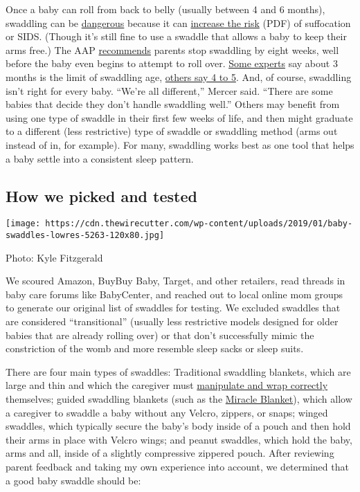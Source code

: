 Once a baby can roll from back to belly (usually between 4 and 6
months), swaddling can be
\href{http://pediatrics.aappublications.org/content/138/5/e20162938}{dangerous}
because it can
\href{http://pediatrics.aappublications.org/content/pediatrics/137/6/e20153275.full.pdf}{increase
the risk} (PDF) of suffocation or SIDS. (Though it's still fine to use a
swaddle that allows a baby to keep their arms free.) The AAP
\href{https://www.healthychildren.org/English/ages-stages/baby/diapers-clothing/Pages/Swaddling-Is-it-Safe.aspx}{recommends}
parents stop swaddling by eight weeks, well before the baby even begins
to attempt to roll over.
\href{https://www.parenting.com/article/ask-dr-sears-alternatives-to-baby-swaddling}{Some
experts} say about 3 months is the limit of swaddling age,
\href{https://www.happiestbaby.com/blogs/baby/when-to-stop-swaddling-your-baby}{others
say 4 to 5}. And, of course, swaddling isn't right for every baby.
``We're all different,'' Mercer said. ``There are some babies that
decide they don't handle swaddling well.'' Others may benefit from using
one type of swaddle in their first few weeks of life, and then might
graduate to a different (less restrictive) type of swaddle or swaddling
method (arms out instead of in, for example). For many, swaddling works
best as one tool that helps a baby settle into a consistent sleep
pattern.

\hypertarget{how-we-picked-and-tested}{%
\subsection{How we picked and tested}\label{how-we-picked-and-tested}}

\texttt{[image: https://cdn.thewirecutter.com/wp-content/uploads/2019/01/baby-swaddles-lowres-5263-120x80.jpg]}

Photo: Kyle Fitzgerald

We scoured Amazon, BuyBuy Baby, Target, and other retailers, read
threads in baby care forums like BabyCenter, and reached out to local
online mom groups to generate our original list of swaddles for testing.
We excluded swaddles that are considered ``transitional'' (usually less
restrictive models designed for older babies that are already rolling
over) or that don't successfully mimic the constriction of the womb and
more resemble sleep sacks or sleep suits.

There are four main types of swaddles: Traditional swaddling blankets,
which are large and thin and which the caregiver must
\href{https://www.adenandanais.com/blog/how-to-swaddle-a-baby}{manipulate
and wrap correctly} themselves; guided swaddling blankets (such as the
\href{https://www.nytimes3xbfgragh.onion/wirecutter/out/link/30692/150983/4/86647/?merchant=Amazon}{Miracle
Blanket}), which allow a caregiver to swaddle a baby without any Velcro,
zippers, or snaps; winged swaddles, which typically secure the baby's
body inside of a pouch and then hold their arms in place with Velcro
wings; and peanut swaddles, which hold the baby, arms and all, inside of
a slightly compressive zippered pouch. After reviewing parent feedback
and taking my own experience into account, we determined that a good
baby swaddle should be:

